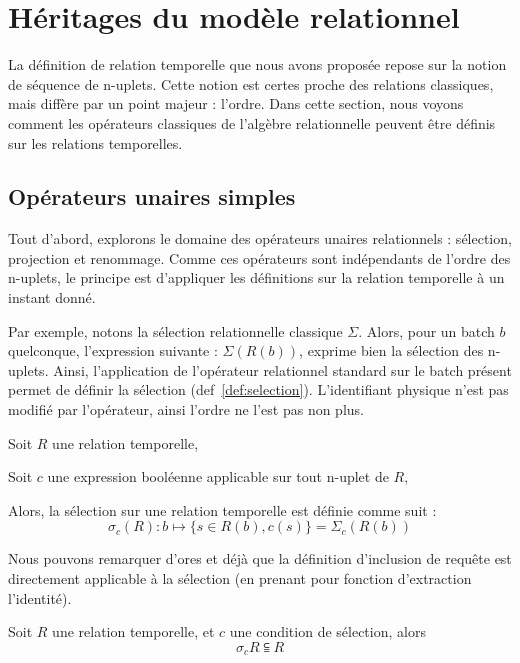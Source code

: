 \section{Héritages du modèle relationnel}\label{sec:contrib:astral:relationnel}
La définition de relation temporelle que nous avons proposée repose sur la notion de séquence de n-uplets. Cette notion est certes proche des relations classiques, mais diffère par un point majeur : l'ordre. Dans cette section, nous voyons comment les opérateurs classiques de l'algèbre relationnelle peuvent être définis sur les relations temporelles.

\subsection{Opérateurs unaires simples}
Tout d'abord, explorons le domaine des opérateurs unaires relationnels : sélection, projection et renommage. Comme ces opérateurs sont indépendants de l'ordre des n-uplets, le principe est d'appliquer les définitions sur la relation temporelle à un instant donné.

Par exemple, notons la sélection relationnelle classique $\Sigma$. Alors, pour un batch $b$ quelconque, l'expression suivante : $\Sigma(R(b))$, exprime bien la sélection des n-uplets. Ainsi, l'application de l'opérateur relationnel standard sur le batch présent permet de définir la sélection (def~\ref{def:selection}). L'identifiant physique n'est pas modifié par l'opérateur, ainsi l'ordre ne l'est pas non plus.
\begin{defi}[Sélection]\label{def:selection}
Soit $R$ une relation temporelle,

Soit $c$ une expression booléenne applicable sur tout n-uplet de $R$,

Alors, la sélection sur une relation temporelle est définie comme suit :
$$\sigma_{c}(R) : b \mapsto \{s\in R(b), c(s)\} = \Sigma_c(R(b))$$
\end{defi}

Nous pouvons remarquer d'ores et déjà que la définition d'inclusion de requête est directement applicable à la sélection (en prenant pour fonction d'extraction l'identité).
\begin{prop}
Soit $R$ une relation temporelle, et $c$ une condition de sélection, alors $$\sigma_c R \subseteqq R$$
\end{prop}

